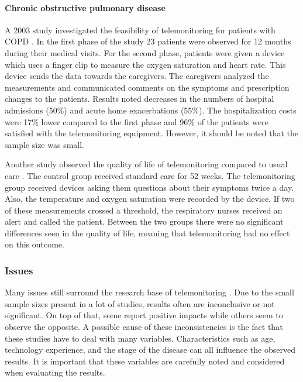         \paragraph{Chronic obstructive pulmonary disease} A 2003 study investigated the feasibility of telemonitoring for patients with COPD \cite{maiolo2003home}. In the first phase of the study 23 patients were observed for 12 months during their medical visits. For the second phase, patients were given a device which uses a finger clip to measure the oxygen saturation and heart rate. This device sends the data towards the caregivers. The caregivers analyzed the measurements and communicated comments on the symptoms and prescription changes to the patients. Results noted decreases in the numbers of hospital admissions (50\%) and acute home exacerbations (55\%). The hospitalization costs were 17\% lower compared to the first phase and 96\% of the patients were satisfied with the telemonitoring equipment. However, it should be noted that the sample size was small.

        Another study observed the quality of life of telemonitoring compared to usual care \cite{lewis2010home}. The control group received standard care for 52 weeks. The telemonitoring group received devices asking them questions about their symptoms twice a day. Also, the temperature and oxygen saturation were recorded by the device. If two of these measurements crossed a threshold, the respiratory nurses received an alert and called the patient. Between the two groups there were no significant differences seen in the quality of life, meaning that telemonitoring had no effect on this outcome.

        \subsubsection{Issues}

        Many issues still surround the research base of telemonitoring \cite{systematic_review}. Due to the small sample sizes present in a lot of studies, results often are inconclusive or not significant. On top of that, some report positive impacts while others seem to observe the opposite. A possible cause of these inconsistencies is the fact that these studies have to deal with many variables. Characteristics such as age, technology experience, and the stage of the disease can all influence the observed results. It is important that these variables are carefully noted and considered when evaluating the results.
        
